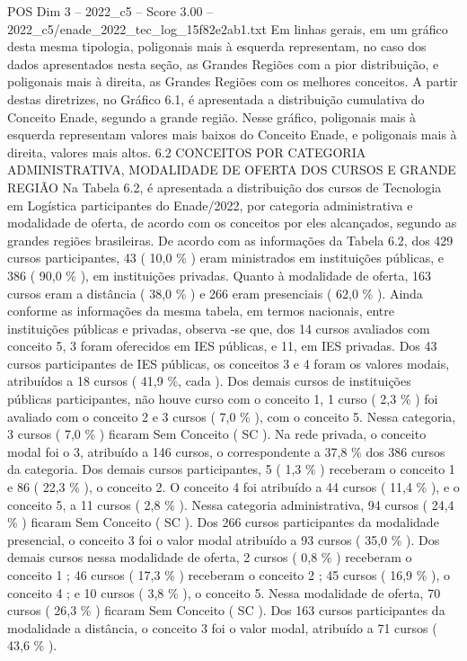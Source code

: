 \begin{textsample}{POS Dim 3 – 2022\_c5 – Score 3.00 – 2022\_c5/enade\_2022\_tec\_log\_15f82e2ab1.txt}
Em linhas gerais, em um gráfico desta mesma tipologia, poligonais mais à esquerda representam, no caso dos dados apresentados nesta seção, as Grandes Regiões com a pior distribuição, e poligonais mais à direita, as Grandes Regiões com os melhores conceitos.
A partir destas diretrizes, no Gráfico 6.1, é apresentada a distribuição cumulativa do Conceito Enade, segundo a grande região.
Nesse gráfico, poligonais mais à esquerda representam valores mais baixos do Conceito Enade, e poligonais mais à direita, valores mais altos. 6.2 CONCEITOS POR CATEGORIA ADMINISTRATIVA, MODALIDADE DE OFERTA DOS CURSOS E GRANDE REGIÃO Na Tabela 6.2, é apresentada a distribuição dos cursos de Tecnologia em Logística participantes do Enade/2022, por categoria administrativa e modalidade de oferta, de acordo com os conceitos por eles alcançados, segundo as grandes regiões brasileiras.
De acordo com as informações da Tabela 6.2, dos 429 cursos participantes, 43 ( 10,0 \% ) eram ministrados em instituições públicas, e 386 ( 90,0 \% ), em instituições privadas.
Quanto à modalidade de oferta, 163 cursos eram a distância ( 38,0 \% ) e 266 eram presenciais ( 62,0 \% ).
Ainda conforme as informações da mesma tabela, em termos nacionais, entre instituições públicas e privadas, observa -se que, dos 14 cursos avaliados com conceito 5, 3 foram oferecidos em IES públicas, e 11, em IES privadas.
Dos 43 cursos participantes de IES públicas, os conceitos 3 e 4 foram os valores modais, atribuídos a 18 cursos ( 41,9 \%, cada ).
Dos demais cursos de instituições públicas participantes, não houve curso com o conceito 1, 1 curso ( 2,3 \% ) foi avaliado com o conceito 2 e 3 cursos ( 7,0 \% ), com o conceito 5.
Nessa categoria, 3 cursos ( 7,0 \% ) ficaram Sem Conceito ( SC ).
Na rede privada, o conceito modal foi o 3, atribuído a 146 cursos, o correspondente a 37,8 \% dos 386 cursos da categoria.
Dos demais cursos participantes, 5 ( 1,3 \% ) receberam o conceito 1 e 86 ( 22,3 \% ), o conceito 2.
O conceito 4 foi atribuído a 44 cursos ( 11,4 \% ), e o conceito 5, a 11 cursos ( 2,8 \% ).
Nessa categoria administrativa, 94 cursos ( 24,4 \% ) ficaram Sem Conceito ( SC ).
Dos 266 cursos participantes da modalidade presencial, o conceito 3 foi o valor modal atribuído a 93 cursos ( 35,0 \% ).
Dos demais cursos nessa modalidade de oferta, 2 cursos ( 0,8 \% ) receberam o conceito 1 ; 46 cursos ( 17,3 \% ) receberam o conceito 2 ; 45 cursos ( 16,9 \% ), o conceito 4 ; e 10 cursos ( 3,8 \% ), o conceito 5.
Nessa modalidade de oferta, 70 cursos ( 26,3 \% ) ficaram Sem Conceito ( SC ).
Dos 163 cursos participantes da modalidade a distância, o conceito 3 foi o valor modal, atribuído a 71 cursos ( 43,6 \% ).

\end{textsample}
